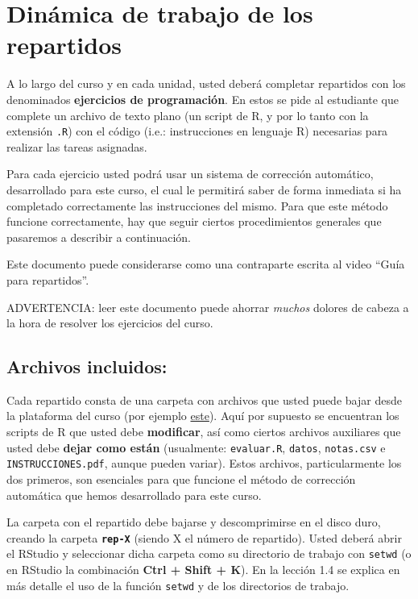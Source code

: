 \documentclass[]{article}
\begin{document}
\section{Dinámica de trabajo de los repartidos}

A lo largo del curso y en cada unidad, usted deberá completar repartidos
con los denominados \textbf{ejercicios de programación}. En estos se
pide al estudiante que complete un archivo de texto plano (un script de
R, y por lo tanto con la extensión \texttt{.R}) con el código (i.e.:
instrucciones en lenguaje R) necesarias para realizar las tareas
asignadas.

Para cada ejercicio usted podrá usar un sistema de corrección
automático, desarrollado para este curso, el cual le permitirá saber de
forma inmediata si ha completado correctamente las instrucciones del
mismo. Para que este método funcione correctamente, hay que seguir
ciertos procedimientos generales que pasaremos a describir a
continuación.

Este documento puede considerarse como una contraparte escrita al video
``Guía para repartidos''.

ADVERTENCIA: leer este documento puede ahorrar \emph{muchos} dolores de
cabeza a la hora de resolver los ejercicios del curso.

\subsection{Archivos incluidos:}

Cada repartido consta de una carpeta con archivos que usted puede bajar
desde la plataforma del curso (por ejemplo
\href{http://eva.universidad.edu.uy/mod/resource/view.php?id=93598}{este}).
Aquí por supuesto se encuentran los scripts de R que usted debe
\textbf{modificar}, así como ciertos archivos auxiliares que usted debe
\textbf{dejar como están} (usualmente: \texttt{evaluar.R},
\texttt{datos}, \texttt{notas.csv} e \texttt{INSTRUCCIONES.pdf}, aunque
pueden variar). Estos archivos, particularmente los dos primeros, son
esenciales para que funcione el método de corrección automática que
hemos desarrollado para este curso.

La carpeta con el repartido debe bajarse y descomprimirse en el disco
duro, creando la carpeta \textbf{\texttt{rep-X}} (siendo X el número de
repartido). Usted deberá abrir el RStudio y seleccionar dicha carpeta
como su directorio de trabajo con \texttt{setwd} (o en RStudio la
combinación \textbf{Ctrl + Shift + K}). En la lección 1.4 se explica en
más detalle el uso de la función \texttt{setwd} y de los directorios de
trabajo.
\end{document}
